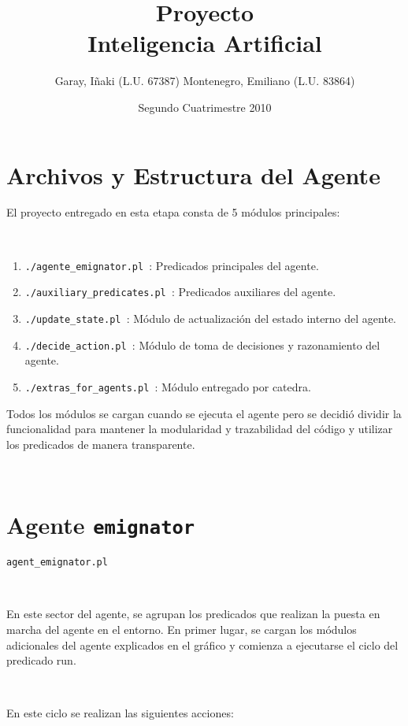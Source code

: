 \documentclass[a4paper,12pt]{report}
\title{Proyecto \\ Inteligencia Artificial}
\author{Garay, I\~{n}aki (L.U. 67387) Montenegro, Emiliano (L.U. 83864)}
\date{Segundo Cuatrimestre 2010}
\begin{document}
\maketitle
\tableofcontents

\chapter{Archivos y Estructura del Agente}

El proyecto entregado en esta etapa consta de 5 m\'{o}dulos principales:

\

\begin{enumerate}
\item \texttt{./agente\_emignator.pl     }: Predicados principales del agente. 
\item \texttt{./auxiliary\_predicates.pl }: Predicados auxiliares del agente.
\item \texttt{./update\_state.pl         }: M\'{o}dulo de actualizaci\'{o}n del estado interno del agente.
\item \texttt{./decide\_action.pl        }: M\'{o}dulo de toma de decisiones y razonamiento del agente. 
\item \texttt{./extras\_for\_agents.pl   }: M\'{o}dulo entregado por catedra.
\end{enumerate}

Todos los m\'{o}dulos se cargan cuando se ejecuta el agente pero se decidi\'{o} dividir la 
funcionalidad para mantener la modularidad y trazabilidad del c\'{o}digo y utilizar los predicados 
de manera transparente.

\ 


\chapter{Agente \texttt{emignator}}

\texttt{agent\_emignator.pl}

\ 

En este sector del agente, se agrupan los predicados que realizan la puesta en marcha del agente en 
el entorno. 
En primer lugar, se cargan los m\'{o}dulos adicionales del agente explicados en el gr\'{a}fico y 
comienza a ejecutarse el ciclo del predicado run.

\ 

En este ciclo se realizan las siguientes acciones:
\end{document}
